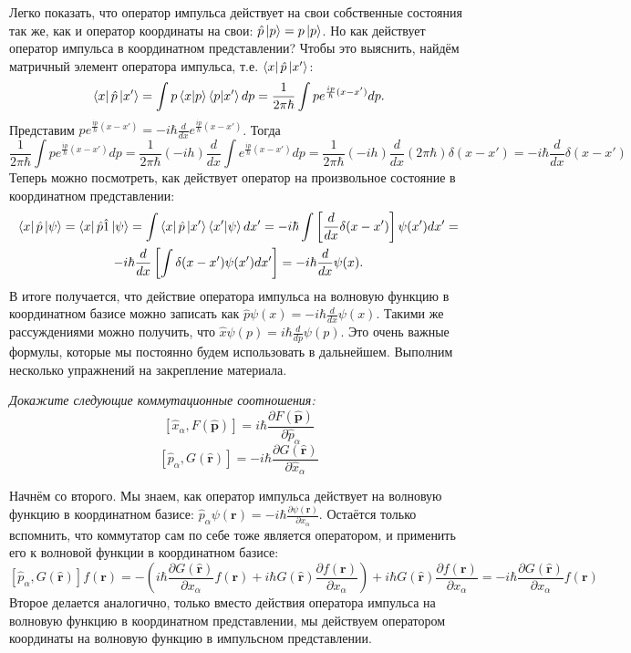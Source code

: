 Легко показать, что оператор импульса действует на свои собственные состояния так же, как и оператор координаты на свои: $\hat{p}\ket{p}=p\ket{p}$. Но как действует оператор импульса в координатном представлении? Чтобы это выяснить, найдём матричный элемент оператора импульса, т.е. $\bra{x}\hat{p}\ket{x'}$:
\[
\bra{x}\hat{p}\ket{x'} = \int p\bra{x}\ket{p}\bra{p}\ket{x'}dp = \frac{1}{2\pi\hbar}\int p e^{\frac{ip}{\hbar}(x-x')}dp.
\]
Представим $pe^{\frac{ip}{\hbar}(x-x')} = -i\hbar\frac{d}{dx}e^{\frac{ip}{\hbar}(x-x')}$. Тогда
\[
\frac{1}{2\pi\hbar}\int p e^{\frac{ip}{\hbar}(x-x')}dp = \frac{1}{2\pi\hbar}(-ih)\frac{d}{dx}\int e^{\frac{ip}{\hbar}(x-x')}dp = \frac{1}{2\pi\hbar}(-ih)\frac{d}{dx}(2\pi\hbar)\delta(x-x') = -i\hbar\frac{d}{dx}\delta(x-x')
\]
Теперь можно посмотреть, как действует оператор на произвольное состояние в координатном представлении:
\begin{multline*}
\bra{x}\hat{p}\ket{\psi} = \bra{x}\hat{p}\hat{1}\ket{\psi} = \int \bra{x}\hat{p}\ket{x'}\bra{x'}\ket{\psi}dx' = -i\hbar\int\left[\frac{d}{dx}\delta(x-x')\right]\psi(x')dx' =\\ -i\hbar\frac{d}{dx}\left[\int\delta(x-x')\psi(x')dx'\right] = -i\hbar\frac{d}{dx}\psi(x).
\end{multline*}
В итоге получается, что действие оператора импульса на волновую функцию в координатном базисе можно записать как $\hat{p}\psi(x) = -i\hbar\frac{d}{dx}\psi(x)$. Такими же рассуждениями можно получить, что $\hat{x}\psi(p) = i\hbar\frac{d}{dp}\psi(p)$. Это очень важные формулы, которые мы постоянно будем использовать в дальнейшем. Выполним несколько упражнений на закрепление материала.
\newpage
{}
\begin{center}
\textit{Докажите следующие коммутационные соотношения:}
\[
[\hat x_{\alpha}, F(\hat{\mathbf p})] = i\hbar\frac{\partial F(\hat{\mathbf p})}{\partial \hat p_{\alpha}}
\]
\[
[\hat p_{\alpha}, G(\hat{\mathbf r})] = -i\hbar\frac{\partial G(\hat{\mathbf r})}{\partial \hat x_{\alpha}}
\]
\end{center}
Начнём со второго. Мы знаем, как оператор импульса действует на волновую функцию в координатном базисе: $\hat p_{\alpha}\psi(\mathbf r) = -i\hbar\frac{\partial\psi(\mathbf r)}{\partial x_{\alpha}}$. Остаётся только вспомнить, что коммутатор сам по себе тоже является оператором, и применить его к волновой функции в координатном базисе:
\[
[\hat p_{\alpha}, G(\hat{\mathbf{r}})]f(\mathbf{r}) = -(i\hbar \frac{\partial G(\hat{\mathbf{r}})}{\partial x_{\alpha}}f(\mathbf{r}) + i\hbar G(\hat{\mathbf{r}}) \frac{\partial f(\mathbf{r})}{\partial x_{\alpha}}) + i\hbar G(\hat{\mathbf{r}})\frac{\partial f(\mathbf{r})}{\partial x_{\alpha}} = -i\hbar \frac{\partial G(\hat{\mathbf{r}})}{\partial x_{\alpha}} f(\mathbf{r})
\]
Второе делается аналогично, только вместо действия оператора импульса на волновую функцию в координатном представлении, мы действуем оператором координаты на волновую функцию в импульсном представлении.

